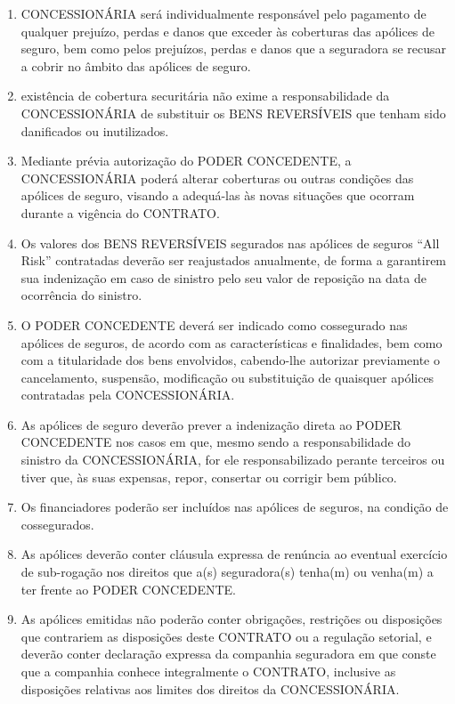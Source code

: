 \documentclass[a4paper,11pt]{report} %
\begin{document}
\begin{enumerate}
\item \label{itm:F7LX}  CONCESSIONÁRIA será individualmente responsável pelo pagamento de qualquer prejuízo, perdas e danos que exceder às coberturas das apólices de seguro, bem como pelos prejuízos, perdas e danos que a seguradora se recusar a cobrir no âmbito das apólices de seguro.

\item \label{itm:V3FB}  existência de cobertura securitária não exime a responsabilidade da CONCESSIONÁRIA de substituir os BENS REVERSÍVEIS que tenham sido danificados ou inutilizados.

\item \label{itm:B9E7} Mediante prévia autorização do PODER CONCEDENTE, a CONCESSIONÁRIA poderá alterar coberturas ou outras condições das apólices de seguro, visando a adequá-las às novas situações que ocorram durante a vigência do CONTRATO.

\item \label{itm:XZVD} Os valores dos BENS REVERSÍVEIS segurados nas apólices de seguros “All Risk” contratadas deverão ser reajustados anualmente, de forma a garantirem sua indenização em caso de sinistro pelo seu valor de reposição na data de ocorrência do sinistro.

\item \label{itm:UHXQ} O PODER CONCEDENTE deverá ser indicado como cossegurado nas apólices de seguros, de acordo com as características e finalidades, bem como com a titularidade dos bens envolvidos, cabendo-lhe autorizar previamente o cancelamento, suspensão, modificação ou substituição de quaisquer apólices contratadas pela CONCESSIONÁRIA.

\item \label{itm:5HSF} As apólices de seguro deverão prever a indenização direta ao PODER CONCEDENTE nos casos em que, mesmo sendo a responsabilidade do sinistro da CONCESSIONÁRIA, for ele responsabilizado perante terceiros ou tiver que, às suas expensas, repor, consertar ou corrigir bem público.

\item \label{itm:S2L6} Os financiadores poderão ser incluídos nas apólices de seguros, na condição de cossegurados.

\item \label{itm:GH87} As apólices deverão conter cláusula expressa de renúncia ao eventual exercício de sub-rogação nos direitos que a(s) seguradora(s) tenha(m) ou venha(m) a ter frente ao PODER CONCEDENTE.

\item \label{itm:TMZD} As apólices emitidas não poderão conter obrigações, restrições ou disposições que contrariem as disposições deste CONTRATO ou a regulação setorial, e deverão conter declaração expressa da companhia seguradora em que conste que a companhia conhece integralmente o CONTRATO, inclusive as disposições relativas aos limites dos direitos da CONCESSIONÁRIA.


\end{enumerate}
\end{document}
